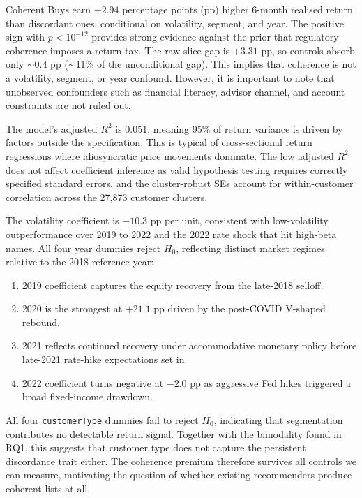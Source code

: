 Coherent Buys earn $+2.94$ percentage points (pp) higher 6-month realised return than discordant ones, conditional on volatility, segment, and year. The positive sign with $p < 10^{-12}$ provides strong evidence against the prior that regulatory coherence imposes a return tax. The raw slice gap is $+3.31$ pp, so controls absorb only $\sim$0.4 pp ($\sim$11\% of the unconditional gap). This implies that coherence is not a volatility, segment, or year confound. However, it is important to note that unobserved confounders such as financial literacy, advisor channel, and account constraints are not ruled out.

The model's adjusted $R^2$ is 0.051, meaning 95\% of return variance is driven by factors outside the specification. This is typical of cross-sectional return regressions where idiosyncratic price movements dominate. The low adjusted $R^2$ does not affect coefficient inference as valid hypothesis testing requires correctly specified standard errors, and the cluster-robust SEs account for within-customer correlation across the 27{,}873 customer clusters.

The volatility coefficient is $-10.3$ pp per unit, consistent with low-volatility outperformance over 2019 to 2022 and the 2022 rate shock that hit high-beta names. All four year dummies reject $H_0$, reflecting distinct market regimes relative to the 2018 reference year:

\begin{enumerate}
    \item 2019 coefficient captures the equity recovery from the late-2018 selloff.
    \item 2020 is the strongest at $+21.1$ pp driven by the post-COVID V-shaped rebound.
    \item 2021 reflects continued recovery under accommodative monetary policy before late-2021 rate-hike expectations set in.
    \item 2022 coefficient turns negative at $-2.0$ pp as aggressive Fed hikes triggered a broad fixed-income drawdown.
\end{enumerate}

All four \texttt{customerType} dummies fail to reject $H_0$, indicating that segmentation contributes no detectable return signal. Together with the bimodality found in RQ1, this suggests that customer type does not capture the persistent discordance trait either. The coherence premium therefore survives all controls we can measure, motivating the question of whether existing recommenders produce coherent lists at all.

